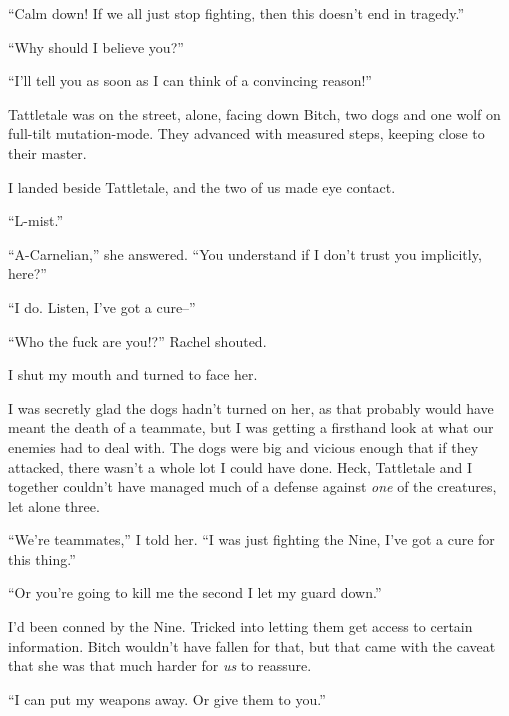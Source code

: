 ``Calm down!  If we all just stop fighting, then this doesn't end in tragedy.''



``Why should I believe you?''



``I'll tell you as soon as I can think of a convincing reason!''



Tattletale was on the street, alone, facing down Bitch, two dogs and one wolf on full-tilt mutation-mode.  They advanced with measured steps, keeping close to their master.



I landed beside Tattletale, and the two of us made eye contact.



``L-mist.''



``A-Carnelian,'' she answered.  ``You understand if I don't trust you implicitly, here?''



``I do.  Listen, I've got a cure--''



``Who the fuck are you!?''  Rachel shouted.



I shut my mouth and turned to face her.



I was secretly glad the dogs hadn't turned on her, as that probably would have meant the death of a teammate, but I was getting a firsthand look at what our enemies had to deal with.  The dogs were big and vicious enough that if they attacked, there wasn't a whole lot I could have done.  Heck, Tattletale and I together couldn't have managed much of a defense against \emph{one }of the creatures, let alone three.



``We're teammates,'' I told her.  ``I was just fighting the Nine, I've got a cure for this thing.''



``Or you're going to kill me the second I let my guard down.''



I'd been conned by the Nine.  Tricked into letting them get access to certain information.  Bitch wouldn't have fallen for that, but that came with the caveat that she was that much harder for \emph{us} to reassure.



``I can put my weapons away.  Or give them to you.''



